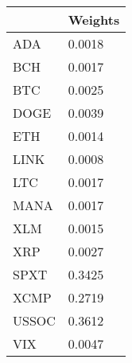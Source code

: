 \begin{tabular}{ll}
\toprule
 & Weights \\
\midrule
ADA & 0.0018 \\
BCH & 0.0017 \\
BTC & 0.0025 \\
DOGE & 0.0039 \\
ETH & 0.0014 \\
LINK & 0.0008 \\
LTC & 0.0017 \\
MANA & 0.0017 \\
XLM & 0.0015 \\
XRP & 0.0027 \\
SPXT & 0.3425 \\
XCMP & 0.2719 \\
USSOC & 0.3612 \\
VIX & 0.0047 \\
\bottomrule
\end{tabular}
